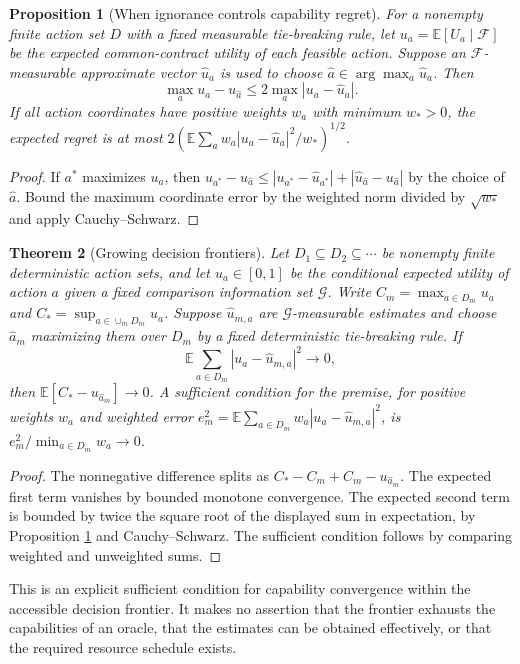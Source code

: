 \documentclass[11pt]{article}
\newtheorem{theorem}{Theorem}[section]\newtheorem{proposition}[theorem]{Proposition}\newtheorem{corollary}[theorem]{Corollary}\newtheorem{definition}[theorem]{Definition}\newtheorem{example}[theorem]{Example}\newtheorem{conjecture}[theorem]{Conjecture}
\newcommand{\E}{\mathbb E}\newcommand{\Prob}{\mathbb P}\newcommand{\F}{\mathcal F}\newcommand{\N}{\mathbb N}\newcommand{\Var}{\operatorname{Var}}\newcommand{\one}{\mathbf 1}\newcommand{\spp}{\mathrm{SPP}}
\begin{document}
\begin{proposition}[When ignorance controls capability regret]\label{prop:regret}
For a nonempty finite action set $D$ with a fixed measurable tie-breaking rule, let $u_a=\E[U_a\mid\F]$ be the expected common-contract utility of each feasible action. Suppose an $\F$-measurable approximate vector $\hat u_a$ is used to choose $\hat a\in\arg\max_a\hat u_a$. Then
\[\max_a u_a-u_{\hat a}\leq 2\max_a|u_a-\hat u_a|.\]
If all action coordinates have positive weights $w_a$ with minimum $w_*>0$, the expected regret is at most $2(\E\sum_a w_a|u_a-\hat u_a|^2/w_*)^{1/2}$.
\end{proposition}
\begin{proof}If $a^*$ maximizes $u_a$, then $u_{a^*}-u_{\hat a}\leq |u_{a^*}-\hat u_{a^*}|+|\hat u_{\hat a}-u_{\hat a}|$ by the choice of $\hat a$. Bound the maximum coordinate error by the weighted norm divided by $\sqrt{w_*}$ and apply Cauchy--Schwarz.\end{proof}
\begin{theorem}[Growing decision frontiers]\label{thm:growing}
Let $D_1\subseteq D_2\subseteq\cdots$ be nonempty finite deterministic action sets, and let $u_a\in[0,1]$ be the conditional expected utility of action $a$ given a fixed comparison information set $\mathcal G$. Write $C_m=\max_{a\in D_m}u_a$ and $C_*=\sup_{a\in\cup_m D_m}u_a$. Suppose $\hat u_{m,a}$ are $\mathcal G$-measurable estimates and choose $\hat a_m$ maximizing them over $D_m$ by a fixed deterministic tie-breaking rule. If
\[\E\sum_{a\in D_m}|u_a-\hat u_{m,a}|^2\longrightarrow0,\]
then $\E[C_*-u_{\hat a_m}]\to0$. A sufficient condition for the premise, for positive weights $w_a$ and weighted error $e_m^2=\E\sum_{a\in D_m}w_a|u_a-\hat u_{m,a}|^2$, is $e_m^2/\min_{a\in D_m}w_a\to0$.
\end{theorem}
\begin{proof}The nonnegative difference splits as $C_*-C_m+C_m-u_{\hat a_m}$. The expected first term vanishes by bounded monotone convergence. The expected second term is bounded by twice the square root of the displayed sum in expectation, by Proposition \ref{prop:regret} and Cauchy--Schwarz. The sufficient condition follows by comparing weighted and unweighted sums.\end{proof}
This is an explicit sufficient condition for capability convergence within the accessible decision frontier. It makes no assertion that the frontier exhausts the capabilities of an oracle, that the estimates can be obtained effectively, or that the required resource schedule exists.
\end{document}

